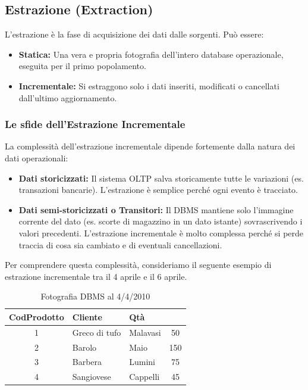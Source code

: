 \subsection{Estrazione (Extraction)}
L'estrazione è la fase di acquisizione dei dati dalle sorgenti. Può essere:
\begin{itemize}
    \item \textbf{Statica:} Una vera e propria fotografia dell'intero database operazionale, eseguita per il primo popolamento.
    \item \textbf{Incrementale:} Si estraggono solo i dati inseriti, modificati o cancellati dall'ultimo aggiornamento.
\end{itemize}

\subsubsection{Le sfide dell'Estrazione Incrementale}
La complessità dell'estrazione incrementale dipende fortemente dalla natura dei dati operazionali:
\begin{itemize}
    \item \textbf{Dati storicizzati:} Il sistema OLTP salva storicamente tutte le variazioni (es. transazioni bancarie). L'estrazione è semplice perché ogni evento è tracciato.
    \item \textbf{Dati semi-storicizzati o Transitori:} Il DBMS mantiene solo l'immagine corrente del dato (es. scorte di magazzino in un dato istante) sovrascrivendo i valori precedenti. L'estrazione incrementale è molto complessa perché si perde traccia di cosa sia cambiato e di eventuali cancellazioni.
\end{itemize}

Per comprendere questa complessità, consideriamo il seguente esempio di estrazione incrementale tra il 4 aprile e il 6 aprile.

\begin{table}[H]
    \centering
    \caption{Fotografia DBMS al 4/4/2010}
    \begin{tabular}{cllc}
    \toprule
    \textbf{CodProdotto} & \textbf{Cliente} & \textbf{Qtà} \\
    \midrule
    1 & Greco di tufo & Malavasi & 50 \\
    2 & Barolo & Maio & 150 \\
    3 & Barbera & Lumini & 75 \\
    4 & Sangiovese & Cappelli & 45 \\
    \bottomrule
    \end{tabular}
\end{table}

